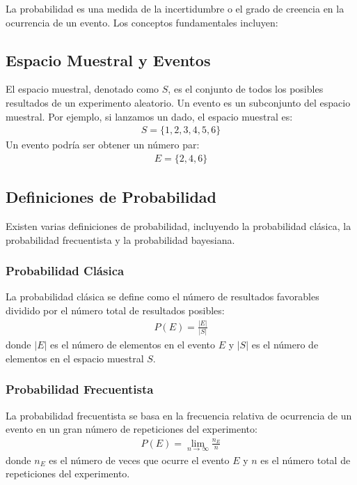 \documentclass[a4paper]{report} %
\begin{document}
La probabilidad es una medida de la incertidumbre o el grado de creencia en la ocurrencia de un evento. Los conceptos fundamentales incluyen:

\subsection{Espacio Muestral y Eventos}

El espacio muestral, denotado como $S$, es el conjunto de todos los posibles resultados de un experimento aleatorio. Un evento es un subconjunto del espacio muestral. Por ejemplo, si lanzamos un dado, el espacio muestral es:
\begin{eqnarray*}
S = \{1, 2, 3, 4, 5, 6\}
\end{eqnarray*}
Un evento podr\'ia ser obtener un n\'umero par:
\begin{eqnarray*}
E = \{2, 4, 6\}
\end{eqnarray*}

\subsection{Definiciones de Probabilidad}

Existen varias definiciones de probabilidad, incluyendo la probabilidad cl\'asica, la probabilidad frecuentista y la probabilidad bayesiana.

\subsubsection{Probabilidad Cl\'asica}

La probabilidad cl\'asica se define como el n\'umero de resultados favorables dividido por el n\'umero total de resultados posibles:
\begin{eqnarray*}
P(E) = \frac{|E|}{|S|}
\end{eqnarray*}
donde $|E|$ es el n\'umero de elementos en el evento $E$ y $|S|$ es el n\'umero de elementos en el espacio muestral $S$.

\subsubsection{Probabilidad Frecuentista}

La probabilidad frecuentista se basa en la frecuencia relativa de ocurrencia de un evento en un gran n\'umero de repeticiones del experimento:
\begin{eqnarray*}
P(E) = \lim_{n \to \infty} \frac{n_E}{n}
\end{eqnarray*}
donde $n_E$ es el n\'umero de veces que ocurre el evento $E$ y $n$ es el n\'umero total de repeticiones del experimento.
\end{document}
